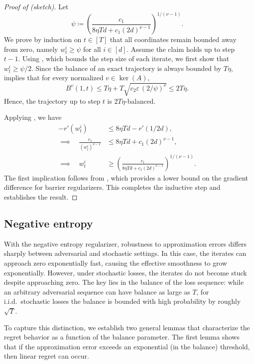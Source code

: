 \documentclass[10pt]{article}
\theoremstyle{definition}
\theoremstyle{remark}
\newenvironment{proofsketch}[1][\proofname]{%
  \begin{proof}[#1 (sketch)]%
}{%
  \end{proof}%
}
\renewcommand{\epsilon}{\varepsilon}
\newcommand{\barconst}{\nu}
\begin{document}
\begin{proofsketch}[Proof of ]
Let 
$$
    \psi \coloneqq 
    \left(\frac{c_1}{8\eta Td + c_1(2d)^{\barconst-1}}\right)^{\!1/(\barconst-1)}
    .
$$
We prove by induction on $t \in [T]$ that all coordinates remain bounded away from zero, namely $w_t^i \ge \psi$ for all $i \in [d]$. 
% 
Assume the claim holds up to step $t-1$. 
Using , which bounds the step size of each iterate, we first show that $w_t^i \ge \psi/2$. 
Since the balance of an exact trajectory is always bounded by $T\eta$,  implies that for every normalized $v \in \ker(A)$,
\[
    B^v(1,t) \le T\eta + T\sqrt{c_2\epsilon\,(2/\psi)^{\barconst}} \le 2T\eta.
\]
Hence, the trajectory up to step $t$ is $2T\eta$-balanced. 

Applying , we have
\begin{align*}
    -r'(w_t^i) &\le 8\eta Td - r'(1/2d), \\
    \implies\quad 
    \frac{c_1}{(w_t^i)^{\barconst-1}} &\le 8\eta Td + c_1(2d)^{\barconst-1}, \\
    \implies\quad 
    w_t^i &\ge 
    \left(\frac{c_1}{8\eta Td + c_1(2d)^{\barconst-1}}\right)^{\!1/(\barconst-1)}.
\end{align*}
% 
The first implication follows from , which provides a lower bound on the gradient difference for barrier regularizers. 
This completes the inductive step and establishes the result.
\end{proofsketch}





\subsection{Negative entropy}\label{sec:entropy}

With the negative entropy regularizer, robustness to approximation errors differs sharply between adversarial and stochastic settings. In this case, the iterates can approach zero exponentially fast, causing the effective smoothness to grow exponentially. However, under stochastic losses, the iterates do not become stuck despite approaching zero. The key lies in the balance of the loss sequence: while an arbitrary adversarial sequence can have balance as large as $T$, for i.i.d.\ stochastic losses the balance is bounded with high probability by roughly $\sqrt{T}$.

To capture this distinction, we establish two general lemmas that characterize the regret behavior as a function of the balance parameter. 
The first lemma shows that if the approximation error exceeds an exponential (in the balance) threshold, then linear regret can occur.
\end{document}
